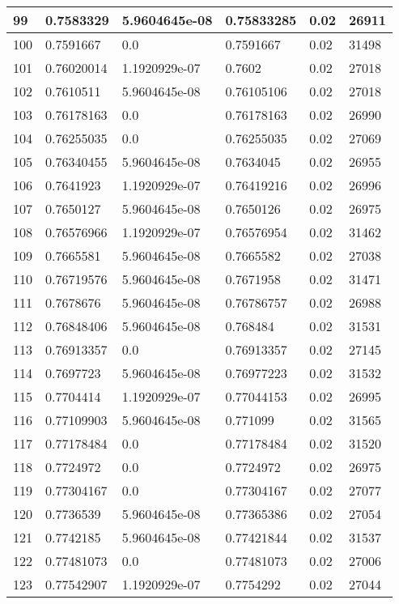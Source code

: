\begin{longtable}{|l|l|l|l|l|l|}
99 & 0.7583329 & 5.9604645e-08 & 0.75833285 & 0.02 & 26911 \\ \hline 
100 & 0.7591667 & 0.0 & 0.7591667 & 0.02 & 31498 \\ \hline 
101 & 0.76020014 & 1.1920929e-07 & 0.7602 & 0.02 & 27018 \\ \hline 
102 & 0.7610511 & 5.9604645e-08 & 0.76105106 & 0.02 & 27018 \\ \hline 
103 & 0.76178163 & 0.0 & 0.76178163 & 0.02 & 26990 \\ \hline 
104 & 0.76255035 & 0.0 & 0.76255035 & 0.02 & 27069 \\ \hline 
105 & 0.76340455 & 5.9604645e-08 & 0.7634045 & 0.02 & 26955 \\ \hline 
106 & 0.7641923 & 1.1920929e-07 & 0.76419216 & 0.02 & 26996 \\ \hline 
107 & 0.7650127 & 5.9604645e-08 & 0.7650126 & 0.02 & 26975 \\ \hline 
108 & 0.76576966 & 1.1920929e-07 & 0.76576954 & 0.02 & 31462 \\ \hline 
109 & 0.7665581 & 5.9604645e-08 & 0.7665582 & 0.02 & 27038 \\ \hline 
110 & 0.76719576 & 5.9604645e-08 & 0.7671958 & 0.02 & 31471 \\ \hline 
111 & 0.7678676 & 5.9604645e-08 & 0.76786757 & 0.02 & 26988 \\ \hline 
112 & 0.76848406 & 5.9604645e-08 & 0.768484 & 0.02 & 31531 \\ \hline 
113 & 0.76913357 & 0.0 & 0.76913357 & 0.02 & 27145 \\ \hline 
114 & 0.7697723 & 5.9604645e-08 & 0.76977223 & 0.02 & 31532 \\ \hline 
115 & 0.7704414 & 1.1920929e-07 & 0.77044153 & 0.02 & 26995 \\ \hline 
116 & 0.77109903 & 5.9604645e-08 & 0.771099 & 0.02 & 31565 \\ \hline 
117 & 0.77178484 & 0.0 & 0.77178484 & 0.02 & 31520 \\ \hline 
118 & 0.7724972 & 0.0 & 0.7724972 & 0.02 & 26975 \\ \hline 
119 & 0.77304167 & 0.0 & 0.77304167 & 0.02 & 27077 \\ \hline 
120 & 0.7736539 & 5.9604645e-08 & 0.77365386 & 0.02 & 27054 \\ \hline 
121 & 0.7742185 & 5.9604645e-08 & 0.77421844 & 0.02 & 31537 \\ \hline 
122 & 0.77481073 & 0.0 & 0.77481073 & 0.02 & 27006 \\ \hline 
123 & 0.77542907 & 1.1920929e-07 & 0.7754292 & 0.02 & 27044 \\ \hline 

\end{longtable}
